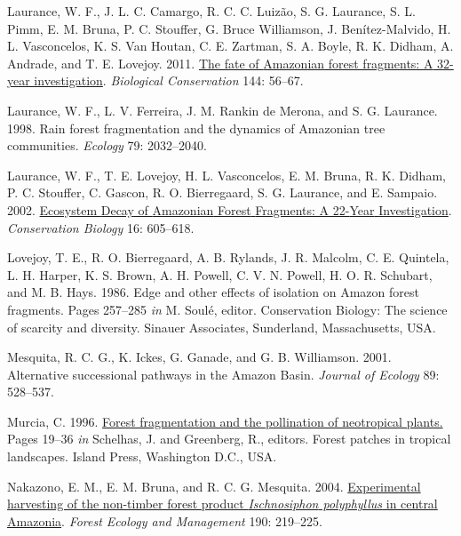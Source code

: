 \documentclass[
  man, donotrepeattitle,floatsintext]{apa6}
\newlength{\cslhangindent}
\newlength{\cslentryspacingunit} %
\newenvironment{CSLReferences}[2] %
 {%
  \setlength{\parindent}{0pt}
  \ifodd #1
  \let\oldpar\par
  \def\par{\hangindent=\cslhangindent\oldpar}
  \fi
  \setlength{\parskip}{#2\cslentryspacingunit}
 }%
 {}
\begin{document}
\begin{CSLReferences}{1}{0}
\leavevmode{}%
Laurance, W. F., J. L. C. Camargo, R. C. C. Luizão, S. G. Laurance, S. L. Pimm, E. M. Bruna, P. C. Stouffer, G. Bruce Williamson, J. Benítez-Malvido, H. L. Vasconcelos, K. S. Van Houtan, C. E. Zartman, S. A. Boyle, R. K. Didham, A. Andrade, and T. E. Lovejoy. 2011. \href{https://doi.org/10.1016/j.biocon.2010.09.021}{The fate of {Amazonian} forest fragments: {A} 32-year investigation}. \emph{Biological Conservation} 144: 56--67.

\leavevmode{}%
Laurance, W. F., L. V. Ferreira, J. M. Rankin de Merona, and S. G. Laurance. 1998. Rain forest fragmentation and the dynamics of {Amazonian} tree communities. \emph{Ecology} 79: 2032--2040.

\leavevmode{}%
Laurance, W. F., T. E. Lovejoy, H. L. Vasconcelos, E. M. Bruna, R. K. Didham, P. C. Stouffer, C. Gascon, R. O. Bierregaard, S. G. Laurance, and E. Sampaio. 2002. \href{https://doi.org/10.1046/j.1523-1739.2002.01025.x}{Ecosystem {Decay} of {Amazonian} {Forest} {Fragments}: A 22-{Year} {Investigation}}. \emph{Conservation Biology} 16: 605--618.

\leavevmode{}%
Lovejoy, T. E., R. O. Bierregaard, A. B. Rylands, J. R. Malcolm, C. E. Quintela, L. H. Harper, K. S. Brown, A. H. Powell, C. V. N. Powell, H. O. R. Schubart, and M. B. Hays. 1986. Edge and other effects of isolation on {Amazon} forest fragments. Pages 257--285 \emph{in} M. Soulé, editor. Conservation {Biology}: The science of scarcity and diversity. Sinauer Associates, Sunderland, Massachusetts, USA.

\leavevmode{}%
Mesquita, R. C. G., K. Ickes, G. Ganade, and G. B. Williamson. 2001. Alternative successional pathways in the {Amazon} {Basin}. \emph{Journal of Ecology} 89: 528--537.

\leavevmode{}%
Murcia, C. 1996. \href{https://www.cabdirect.org/cabdirect/abstract/19970611608}{Forest fragmentation and the pollination of neotropical plants.} Pages 19--36 \emph{in} Schelhas, J. and Greenberg, R., editors. Forest patches in tropical landscapes. Island Press, Washington D.C., USA.

\leavevmode{}%
Nakazono, E. M., E. M. Bruna, and R. C. G. Mesquita. 2004. \href{https://doi.org/10.1016/j.foreco.2003.10.013}{Experimental harvesting of the non-timber forest product \emph{{Ischnosiphon} polyphyllus} in central {Amazonia}}. \emph{Forest Ecology and Management} 190: 219--225.


\end{CSLReferences}
\end{document}
